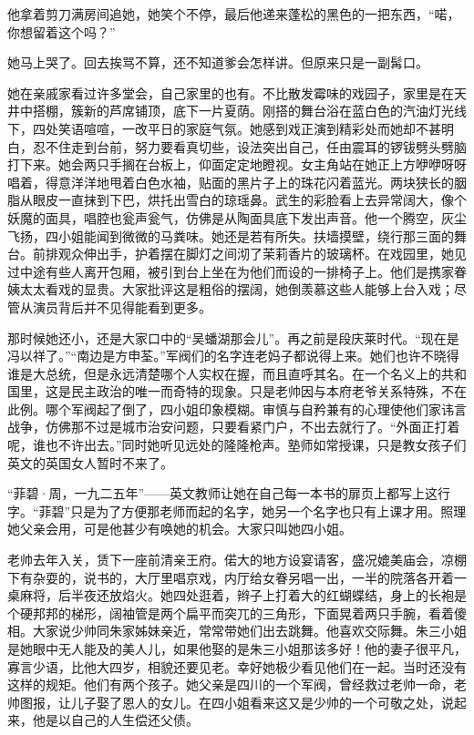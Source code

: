\par 他拿着剪刀满房间追她，她笑个不停，最后他递来蓬松的黑色的一把东西，“喏，你想留着这个吗？”
\par 她马上哭了。回去挨骂不算，还不知道爹会怎样讲。但原来只是一副髯口。
\par 她在亲戚家看过许多堂会，自己家里的也有。不比散发霉味的戏园子，家里是在天井中搭棚，簇新的芦席铺顶，底下一片夏荫。刚搭的舞台浴在蓝白色的汽油灯光线下，四处笑语喧喧，一改平日的家庭气氛。她感到戏正演到精彩处而她却不甚明白，忍不住走到台前，努力要看真切些，设法突出自己，任由震耳的锣钹劈头劈脑打下来。她会两只手搁在台板上，仰面定定地瞪视。女主角站在她正上方咿咿呀呀唱着，得意洋洋地甩着白色水袖，贴面的黑片子上的珠花闪着蓝光。两块狭长的胭脂从眼皮一直抹到下巴，烘托出雪白的琼瑶鼻。武生的彩脸看上去异常阔大，像个妖魔的面具，唱腔也瓮声瓮气，仿佛是从陶面具底下发出声音。他一个腾空，灰尘飞扬，四小姐能闻到微微的马粪味。她还是若有所失。扶墙摸壁，绕行那三面的舞台。前排观众伸出手，护着摆在脚灯之间沏了茉莉香片的玻璃杯。在戏园里，她见过中途有些人离开包厢，被引到台上坐在为他们而设的一排椅子上。他们是携家眷姨太太看戏的显贵。大家批评这是粗俗的摆阔，她倒羡慕这些人能够上台入戏；尽管从演员背后并不见得能看到更多。
\par 那时候她还小，还是大家口中的“吴蟠湖那会儿”。再之前是段庆莱时代。“现在是冯以祥了。”“南边是方申荃。”军阀们的名字连老妈子都说得上来。她们也许不晓得谁是大总统，但是永远清楚哪个人实权在握，而且直呼其名。在一个名义上的共和国里，这是民主政治的唯一而奇特的现象。只是老帅因与本府老爷关系特殊，不在此例。哪个军阀起了倒了，四小姐印象模糊。审慎与自矜兼有的心理使他们家讳言战争，仿佛那不过是城市治安问题，只要看紧门户，不出去就行了。“外面正打着呢，谁也不许出去。”同时她听见远处的隆隆枪声。塾师如常授课，只是教女孩子们英文的英国女人暂时不来了。
\par “菲碧·周，一九二五年”——英文教师让她在自己每一本书的扉页上都写上这行字。“菲碧”只是为了方便那老师而起的名字，她另一个名字也只有上课才用。照理她父亲会用，可是他甚少有唤她的机会。大家只叫她四小姐。
\par 老帅去年入关，赁下一座前清亲王府。偌大的地方设宴请客，盛况媲美庙会，凉棚下有杂耍的，说书的，大厅里唱京戏，内厅给女眷另唱一出，一半的院落各开着一桌麻将，后半夜还放焰火。她四处逛着，辫子上打着大的红蝴蝶结，身上的长袍是个硬邦邦的梯形，阔袖管是两个扁平而突兀的三角形，下面晃着两只手腕，看着傻相。大家说少帅同朱家姊妹亲近，常常带她们出去跳舞。他喜欢交际舞。朱三小姐是她眼中无人能及的美人儿，如果他娶的是朱三小姐那该多好！他的妻子很平凡，寡言少语，比他大四岁，相貌还要见老。幸好她极少看见他们在一起。当时还没有这样的规矩。他们有两个孩子。她父亲是四川的一个军阀，曾经救过老帅一命，老帅图报，让儿子娶了恩人的女儿。在四小姐看来这又是少帅的一个可敬之处，说起来，他是以自己的人生偿还父债。

